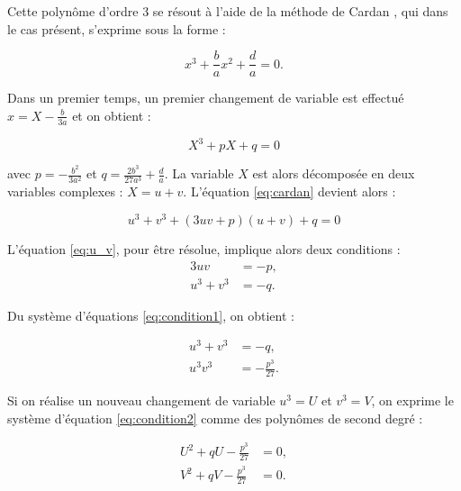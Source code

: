 Cette polynôme d'ordre 3 se résout à l'aide de la méthode de Cardan \cite{nickalls1993new}, qui dans le cas présent, s'exprime sous la forme : 

\begin{equation}
x^3+\frac{b}{a}x^2+\frac{d}{a} = 0.
\end{equation}

Dans un premier temps, un premier changement de variable est effectué $x = X - \frac{b}{3a}$ et on obtient : 

\begin{equation}\label{eq:cardan}
X^3+pX+q = 0
\end{equation}

avec $p = -\frac{b^2}{3a^2}$ et $q = \frac{2b^3}{27a^3}+\frac{d}{a}$. La variable $X$ est alors décomposée en deux variables complexes : $X = u+v$. L'équation \ref{eq:cardan} devient alors : 

\begin{equation}\label{eq:u_v}
u^3+v^3+(3uv+p)(u+v)+q = 0
\end{equation}

L'équation \ref{eq:u_v}, pour être résolue, implique alors deux conditions  : 
\begin{subequations}\label{eq:condition1}
\begin{align}
3uv &= -p,\\
u^3+v^3 &= -q.
\end{align}
\end{subequations}

Du système d'équations \ref{eq:condition1}, on obtient  : 

\begin{subequations}\label{eq:condition2}
\begin{align}
u^3+v^3 &= -q,\\
u^3v^3 &= -\frac{p^3}{27}.
\end{align}
\end{subequations}

Si on réalise un nouveau changement de variable $u^3 = U$ et $v^3 = V$, on exprime le système d'équation \ref{eq:condition2} comme des polynômes de second degré : 

\begin{subequations}\label{eq:polyUV}
\begin{align}
U^2+qU-\frac{p^3}{27} &= 0,\\
V^2+qV-\frac{p^3}{27} &= 0.
\end{align}
\end{subequations}

